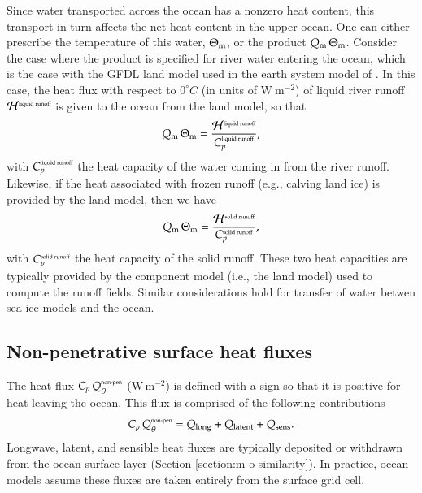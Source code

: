 Since water transported across the ocean has a nonzero heat content,
this transport in turn affects the net heat content in the upper
ocean.  One can either prescribe the temperature of this water,
$\Theta_{\mbox{\scriptsize m}}$, or the product $Q_{\mbox{\scriptsize m}} \, \Theta_{\mbox{\scriptsize m}}$.  Consider the case where
the product is specified for river water entering the ocean, which is
the case with the GFDL land model used in the earth system model of
\cite{Dunne_etal_part1_2012}.  In this case, the heat flux with
respect to $0^{\circ}C$ (in units of $\mbox{W}~\mbox{m}^{-2}$) of
liquid river runoff ${\cal H}^{\mbox{\tiny liquid runoff}}$ is given
to the ocean from the land model, so that
\begin{equation}
     Q_{\mbox{\scriptsize m}} \, \Theta_{\mbox{\scriptsize m}} = \frac{  {\cal H}^{\mbox{\tiny liquid runoff}} } {C_{p}^{\mbox{\tiny liquid runoff}}},
\label{eq:river-heating-kpp}
\end{equation}
with $C_{p}^{\mbox{\tiny liquid runoff}}$ the heat capacity of the
water coming in from the river runoff.  Likewise, if the heat
associated with frozen runoff (e.g., calving land ice) is provided by
the land model, then we have
\begin{equation}
      Q_{\mbox{\scriptsize m}} \, \Theta_{\mbox{\scriptsize m}} = \frac{{\cal H}^{\mbox{\tiny solid runoff}}}{C_{p}^{\mbox{\tiny solid runoff}}},
\end{equation}
with $C_{p}^{\mbox{\tiny solid runoff}}$ the heat capacity of the
solid runoff.  These two heat capacities are typically provided by the
component model (i.e., the land model) used to compute the runoff
fields.  Similar considerations hold for transfer of water betwen sea
ice models and the ocean.


\subsection{Non-penetrative surface heat fluxes} 
\label{subsection:non-pen-buoyancy-fluxes}

The heat flux $C_{p} \, Q_{\theta}^{\mbox{\tiny non-pen}}$ ($\mbox{W}
\, \mbox{m}^{-2}$) is defined with a sign so that it is positive for
heat leaving the ocean. This flux is comprised of the following
contributions \citep[see page 34 of][]{Gill1982}
\begin{equation}
 C_{p}  \, Q_{\theta}^{\mbox{\tiny non-pen}}
 =  Q_{\mbox{\scriptsize long}} + Q_{\mbox{\scriptsize latent}} +
     Q_{\mbox{\scriptsize sens}}. 
\label{eq:non-penetrative-for-kpp}
\end{equation}
Longwave, latent, and sensible heat fluxes are typically deposited or
withdrawn from the ocean surface layer (Section
\ref{section:m-o-similarity}).  In practice, ocean models assume
these fluxes are taken entirely from the surface grid cell.  

